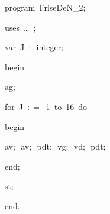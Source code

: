 
{
\parindent {}
\medskip

\carrenoir
\vspace{\neglskip}\mbox{\blc  \idt  \mcl program\idt \ FriseDeN\_2$;$
}\par 
\vspace{\neglskip}\mbox{\blc \blk\idt \mcl uses\idt \ \ldots\ $;$
}\par 
\pagebreak[3] 
\vspace{\neglskip}\mbox{\blc  \blk\idt  \mcl var\idt \ J\ $:$\ integer$;$}\par 
\vspace{\neglskip}\mbox{\blc  \idt  \mcl begin\idt \ }\par 
\vspace{\neglskip}\mbox{\blc  \blk\idt  ag$;$}\par 
\pagebreak[3] 
\vspace{\neglskip}\mbox{\blc  \blk\idt  \mcl for\idt \ J\ $:$$=$\ 1\ \mcl to\idt \ 16\ \mcl do\idt }\par 
\vspace{\neglskip}\mbox{\blc  \blk\blk\idt  \mcl begin\idt }\par 
\vspace{\neglskip}\mbox{\blc  \blk\blk\blk\idt  av$;$\ av$;$\ pdt$;$\ vg$;$\ vd$;$\ pdt$;$\ }\par 
\vspace{\neglskip}\mbox{\blc  \blk\blk\idt  \mcl end\idt $;$}\par 
\vspace{\neglskip}\mbox{\blc  \blk\idt  st$;$}\par 
\vspace{\neglskip}\mbox{\blc  \idt  \mcl end\idt $.$}\par 

\medskip }

